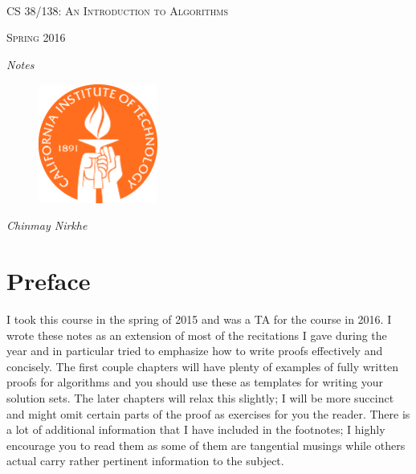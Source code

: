 \documentclass[10pt]{article}
\theoremstyle{plain}
\theoremstyle{definition}
\numberwithin{equation}{section}
\numberwithin{figure}{section}
\begin{document}
\begin{titlepage}
	\centering
	\ \\ \ \\ \ \\ \ \ \\ \ \\ \ \\ \ \\ \ \\ 
	{\scshape\LARGE CS 38/138: An Introduction to Algorithms \par}
	\vspace{1cm}
	{\scshape\Large Spring 2016\par}
	\vspace{0.5cm}
	{\Large\itshape Notes\par}
	\vspace{2cm}
	{\begin{figure}[!h]
\centering
\includegraphics[width=0.35\textwidth]{tech_seal.png}
\end{figure}}

	\vspace{3.5cm}
	{\Large\itshape Chinmay Nirkhe\par}
\end{titlepage}

\tableofcontents

\newpage

\section{Preface}
\noindent I took this course in the spring of 2015 and was a TA for the course in 2016. I wrote these notes as an extension of most of the recitations I gave during the year and in particular tried to emphasize how to write proofs effectively and concisely. The first couple chapters will have plenty of examples of fully written proofs for algorithms and you should use these as templates for writing your solution sets. The later chapters will relax this slightly; I will be more succinct and might omit certain parts of the proof as exercises for you the reader. There is a lot of additional information that I have included in the footnotes; I highly encourage you to read them as some of them are tangential musings while others actual carry rather pertinent information to the subject. \\
\end{document}

